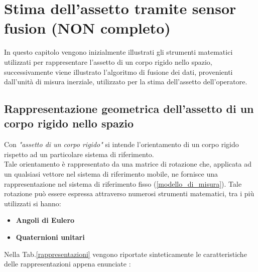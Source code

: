 \chapter{Stima dell'assetto tramite sensor fusion (NON completo)}
\label{elaborazione}
In questo capitolo vengono inizialmente illustrati gli strumenti matematici utilizzati per rappresentare l'assetto di un corpo rigido nello spazio,
successivamente viene illustrato l'algoritmo di fusione dei dati, provenienti dall'unità di misura inerziale, utilizzato per la stima dell'assetto dell'operatore.


\section{Rappresentazione geometrica dell'assetto di un corpo rigido nello spazio}
\label{assetto}
Con \textit{"assetto di un corpo rigido"} si intende l'orientamento di un corpo rigido rispetto ad un particolare sistema di riferimento.\\
Tale orientamento è rappresentato da una matrice di rotazione che, applicata ad un qualsiasi vettore nel sistema di riferimento mobile, ne fornisce una rappresentazione nel sistema di riferimento fisso (\ref{modello_di_misura}). 
Tale rotazione può essere espressa attraverso numerosi strumenti matematici, tra i più utilizzati si hanno:
\begin{itemize}
	\item \textbf{Angoli di Eulero}
	\item \textbf{Quaternioni unitari}
\end{itemize}

Nella Tab.\ref{rappresentazioni} vengono riportate sinteticamente le caratteristiche delle rappresentazioni appena enunciate \cite{assetto}:

